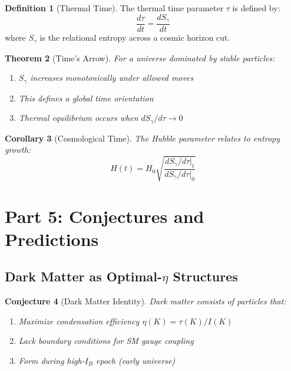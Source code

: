 \documentclass[11pt]{article}
\theoremstyle{plain}
\newtheorem{theorem}{Theorem}[section]
\newtheorem{corollary}[theorem]{Corollary}
\newtheorem{conjecture}[theorem]{Conjecture}
\theoremstyle{definition}
\newtheorem{definition}[theorem]{Definition}
\begin{document}
\begin{definition}[Thermal Time]
  The thermal time parameter $\tau$ is defined by:
  \begin{equation}
    \frac{d\tau}{dt} = \frac{dS_{\gamma}}{dt}
  \end{equation}
  where $S_\gamma$ is the relational entropy across a cosmic horizon cut.
\end{definition}

\begin{theorem}[Time's Arrow]
  For a universe dominated by stable particles:
  \begin{enumerate}
    \item $S_\gamma$ increases monotonically under allowed moves
    \item This defines a global time orientation
    \item Thermal equilibrium occurs when $dS_\gamma/d\tau \to 0$
  \end{enumerate}
\end{theorem}

\begin{corollary}[Cosmological Time]
  The Hubble parameter relates to entropy growth:
  \begin{equation}
    H(t) = H_0 \sqrt{\frac{dS_\gamma/d\tau|_t}{dS_\gamma/d\tau|_0}}
  \end{equation}
\end{corollary}

\section{Part 5: Conjectures and Predictions}
\label{sec:predictions}

\subsection{Dark Matter as Optimal-$\eta$ Structures}

\begin{conjecture}[Dark Matter Identity]
  Dark matter consists of particles that:
  \begin{enumerate}
    \item Maximize condensation efficiency $\eta(K) = \tau(K)/I(K)$
    \item Lack boundary conditions for SM gauge coupling
    \item Form during high-$I_B$ epoch (early universe)
  \end{enumerate}
\end{conjecture}
\end{document}
